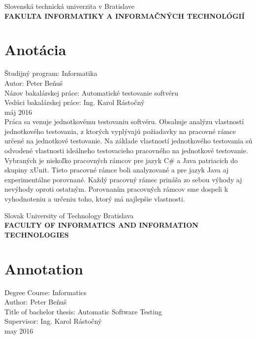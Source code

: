 \documentclass[11pt,twoside,slovak,a4paper]{article}
\begin{document}
	
	\begin{titlepage}
		\begin{center}
			\large 		Slovenská technická univerzita v Bratislave\\
			\textbf{\MakeUppercase{Fakulta informatiky a informačných technológií}}\\
			\hrulefill
		\end{center}
		\section*{Anotácia}
		Študijný program: Informatika\\
		Autor: Peter Beňuš\\
		Názov bakalárskej práce: Automatické testovanie softvéru \\
		Vedúci bakalárskej práce: Ing. Karol Rástočný\\
		máj 2016\\
		Práca sa venuje jednotkovému testovaniu softvéru. Obsahuje analýzu vlastností jednotkového testovania, z ktorých vyplývajú požiadavky na pracovné rámce určené na jednotkové testovanie. Na základe vlastností jednotkového testovania sú odvodené vlastnosti ideálneho testovacieho pracovného na jednotkové testovanie. Vybraných je niekoľko pracovných rámcov pre jazyk C\# a Java patriacich do skupiny xUnit. Tieto pracovné rámce boli analyzované a pre jazyk Java aj experimentálne porovnané. Každý pracovný rámec prináša zo sebou výhody aj nevýhody oproti ostatným. Porovnaním pracovných rámcov sme dospeli k vyhodnoteniu a určeniu toho, ktorý má najlepšie vlastnosti.
	\end{titlepage}
	
	\begin{titlepage}
		\begin{center}
			\large 		Slovak University of Technology Bratislava\\
			\textbf{\MakeUppercase{Faculty of Informatics and Information Technologies}}\\
			\hrulefill
		\end{center}
		\section*{Annotation}
		Degree Course: Informatics\\
		Author: Peter Beňuš \\
		Title of bachelor thesis: Automatic Software Testing\\
		Supervisor: Ing. Karol Rástočný \\
		may 2016 \\
		
		
		
	\end{titlepage}
	
\end{document}
